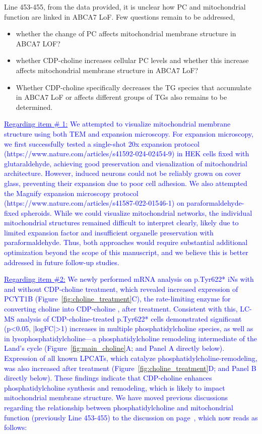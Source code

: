 Line 453-455, from the data provided, it is unclear how PC and mitochondrial function are linked in ABCA7 LoF. Few questions remain to be addressed,
\begin{itemize}
	\item whether the change of PC affects mitochondrial membrane structure in ABCA7 LOF?

	\item whether CDP-choline increases cellular PC levels and whether this increase affects mitochondrial membrane structure in ABCA7 LoF?
	
	\item Whether CDP-choline specifically decreases the TG species that accumulate in ABCA7 LoF or affects different groups of TGs also remains to be determined.
\end{itemize}

\textcolor{blue}{\underline{Regarding item \# 1:} We attempted to visualize mitochondrial membrane structure using both TEM and expansion microscopy. For expansion microscopy, we first successfully tested a single-shot 20x expansion protocol (https://www.nature.com/articles/s41592-024-02454-9) in HEK cells fixed with glutaraldehyde, achieving good preservation and visualization of mitochondrial architecture. However, induced neurons could not be reliably grown on cover glass, preventing their expansion due to poor cell adhesion. We also attempted the Magnify expansion microscopy protocol (https://www.nature.com/articles/s41587-022-01546-1) on paraformaldehyde-fixed spheroids. While we could visualize mitochondrial networks, the individual mitochondrial structures remained difficult to interpret clearly, likely due to limited expansion factor and insufficient organelle preservation with paraformaldehyde. Thus, both approaches would require substantial additional optimization beyond the scope of this manuscript, and we believe this is better addressed in future follow-up studies.}

\textcolor{blue}{\underline{Regarding item \#2:} We newly performed mRNA analysis on p.Tyr622* iNs with and without CDP-choline treatment, which revealed increased expression of PCYT1B (Figure~\ref{fig:choline_treatment}C), the rate-limiting enzyme for converting choline into CDP-choline \cite{Lykidis1998-rj}, after treatment. Consistent with this, LC-MS analysis of CDP-choline-treated p.Tyr622* cells demonstrated significant (p<0.05, |logFC|>1) increases in multiple phosphatidylcholine species, as well as in lysophosphatidylcholine—a phosphatidylcholine remodeling intermediate of the Land’s cycle (Figure~\ref{fig:main_choline}A; and Panel A directly below). Expression of all known LPCATs, which catalyze phosphatidylcholine-remodeling, was also increased  after treatment (Figure~\ref{fig:choline_treatment}D; and Panel B directly below). These findings indicate that CDP-choline enhances phosphatidylcholine synthesis and remodeling, which is likely to impact mitochondrial membrane structure. We have moved previous discussions regarding the relationship between phosphatidylcholine and mitochondrial function (previously Line 453-455) to the discussion on page~\pageref{quoteI-label}, which now reads as follows:}

